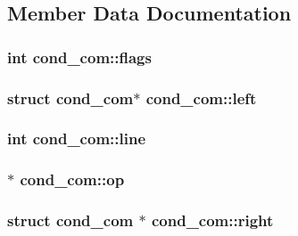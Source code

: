 \subsection{Member Data Documentation}
\subsubsection[{\texorpdfstring{flags}{flags}}]{\setlength{\rightskip}{0pt plus 5cm}int cond\+\_\+com\+::flags}\hypertarget{structcond__com_abe64315eec13089b3dc43c54acb5e6d0}{}\label{structcond__com_abe64315eec13089b3dc43c54acb5e6d0}
\subsubsection[{\texorpdfstring{left}{left}}]{\setlength{\rightskip}{0pt plus 5cm}struct {\bf cond\+\_\+com}$\ast$ cond\+\_\+com\+::left}\hypertarget{structcond__com_a96d0c77c1c43455170008963a48f1711}{}\label{structcond__com_a96d0c77c1c43455170008963a48f1711}
\subsubsection[{\texorpdfstring{line}{line}}]{\setlength{\rightskip}{0pt plus 5cm}int cond\+\_\+com\+::line}\hypertarget{structcond__com_a7a36bcce3ca4c65e93c44648091a9a84}{}\label{structcond__com_a7a36bcce3ca4c65e93c44648091a9a84}
\subsubsection[{\texorpdfstring{op}{op}}]{$\ast$ cond\+\_\+com\+::op}\hypertarget{structcond__com_a3778220cc80ac673817cb33f796b9484}{}\label{structcond__com_a3778220cc80ac673817cb33f796b9484}
\subsubsection[{\texorpdfstring{right}{right}}]{\setlength{\rightskip}{0pt plus 5cm}struct {\bf cond\+\_\+com} $\ast$ cond\+\_\+com\+::right}\hypertarget{structcond__com_ad3879e315749f6f1bd363592c2dd9416}{}\label{structcond__com_ad3879e315749f6f1bd363592c2dd9416}
